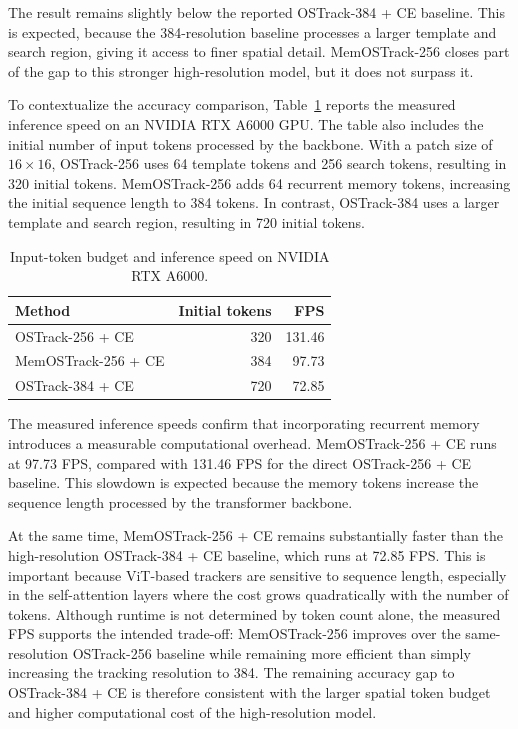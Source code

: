 \documentclass[bachelorthesis]{fer}
\numberwithin{equation}{chapter}
\begin{document}
    The result remains slightly below the reported OSTrack-384 + CE baseline. This is expected, because the 384-resolution baseline processes a larger template and search region, giving it access to finer spatial detail. MemOSTrack-256 closes part of the gap to this stronger high-resolution model, but it does not surpass it.

    To contextualize the accuracy comparison, Table~\ref{tab:speed-comparison} reports the measured inference speed on an NVIDIA RTX A6000 GPU. The table also includes the initial number of input tokens processed by the backbone. With a patch size of \(16 \times 16\), OSTrack-256 uses 64 template tokens and 256 search tokens, resulting in 320 initial tokens. MemOSTrack-256 adds 64 recurrent memory tokens, increasing the initial sequence length to 384 tokens. In contrast, OSTrack-384 uses a larger template and search region, resulting in 720 initial tokens.

    \begin{longtable}[]{@{}lrr@{}}
        \caption{Input-token budget and inference speed on NVIDIA RTX A6000.}\label{tab:speed-comparison} \\
        \toprule\noalign{}
        \textbf{Method}     & \textbf{Initial tokens} & \textbf{FPS} \\
        \midrule\noalign{}
        \endhead
        \bottomrule\noalign{}
        \endlastfoot
        OSTrack-256 + CE    & 320                     & 131.46       \\
        MemOSTrack-256 + CE & 384                     & 97.73        \\
        OSTrack-384 + CE    & 720                     & 72.85        \\
    \end{longtable}

    The measured inference speeds confirm that incorporating recurrent memory introduces a measurable computational overhead. MemOSTrack-256 + CE runs at 97.73 FPS, compared with 131.46 FPS for the direct OSTrack-256 + CE baseline. This slowdown is expected because the memory tokens increase the sequence length processed by the transformer backbone.

    At the same time, MemOSTrack-256 + CE remains substantially faster than the high-resolution OSTrack-384 + CE baseline, which runs at 72.85 FPS. This is important because ViT-based trackers are sensitive to sequence length, especially in the self-attention layers where the cost grows quadratically with the number of tokens. Although runtime is not determined by token count alone, the measured FPS supports the intended trade-off: MemOSTrack-256 improves over the same-resolution OSTrack-256 baseline while remaining more efficient than simply increasing the tracking resolution to 384. The remaining accuracy gap to OSTrack-384 + CE is therefore consistent with the larger spatial token budget and higher computational cost of the high-resolution model.
\end{document}
